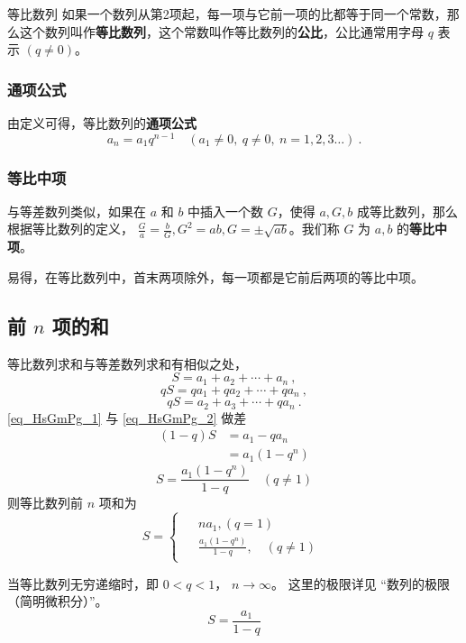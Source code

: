 

\begin{definition}{等比数列}
如果一个数列从第2项起，每一项与它前一项的比都等于同一个常数，那么这个数列叫作\textbf{等比数列}，这个常数叫作等比数列的\textbf{公比}，公比通常用字母 $q$ 表示 $(q\ne 0)$。
\end{definition}

\subsubsection{通项公式}
由定义可得，等比数列的\textbf{通项公式}
\begin{equation}
a_n = a_1 q^{n-1} \quad (a_1 \ne 0,\ q\ne 0,\ n=1,2,3\dots)~.
\end{equation}

\subsubsection{等比中项}
与等差数列类似，如果在 $a$ 和 $b$ 中插入一个数 $G$，使得 $a,G,b$ 成等比数列，那么根据等比数列的定义， $\frac{G}{a} = \frac{b}{G},G^2 = ab,G = \pm \sqrt{ab}$。我们称 $G$ 为 $a,b$ 的\textbf{等比中项}。

易得，在等比数列中，首末两项除外，每一项都是它前后两项的等比中项。

\subsection{前 $n$ 项的和}
等比数列求和与等差数列求和有相似之处，
\begin{equation}\label{eq_HsGmPg_1}
S = a_1 + a_2 + \cdots + a_n~,
\end{equation}
\begin{equation}
qS = qa_1 + qa_2 + \cdots + qa_n~,
\end{equation}
\begin{equation}\label{eq_HsGmPg_2}
qS= a_2 + a_3 + \cdots + qa_n~.
\end{equation}
\autoref{eq_HsGmPg_1} 与 \autoref{eq_HsGmPg_2} 做差
\begin{equation}
\begin{aligned}
(1 - q)S &= a_1 - qa_n\\
&= a_1(1 - q^n)
\end{aligned}
\end{equation}
\begin{equation}
S = \frac{a_1(1-q^n)}{1-q} \quad (q\neq 1)
\end{equation}
则等比数列前 $n$ 项和为
\begin{equation}
S = 
\begin{cases}
\begin{aligned}
&na_1,(q = 1) \\
&\frac{a_1(1-q^n)}{1-q},\quad (q \neq 1)
\end{aligned}
\end{cases}
\end{equation}

当等比数列无穷递缩时，即 $0<q<1$， $n\rightarrow \infty$。 这里的极限详见 “数列的极限（简明微积分）”。
\begin{equation}
S = \frac{a_1}{1 - q}
\end{equation}
